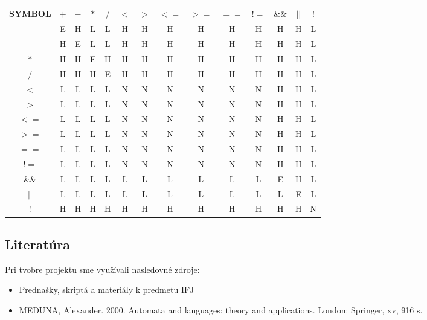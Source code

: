 \documentclass[12pt, a4paper]{article}
\begin{document}
	        \begin{center}
	            \begin{tabular}{| c | c | c | c | c | c | c | c | c | c | c | c | c | c |}
	            \hline
	            SYMBOL & $+$ & $-$ & $*$ & $/$ & $<$ & $>$ & $<=$ & $>=$ & $==$ & $!=$ & $\&\&$ & $||$ & $!$\\
	            \hline
	            $+$ & E & H & L & L & H & H & H & H & H & H & H & H & L\\
	            $-$ & H & E & L & L & H & H & H & H & H & H & H & H & L\\
	            $*$ & H & H & E & H & H & H & H & H & H & H & H & H & L\\
	            $/$ & H & H & H & E & H & H & H & H & H & H & H & H & L\\
	            $<$ & L & L & L & L & N & N & N & N & N & N & H & H & L\\
	            $>$ & L & L & L & L & N & N & N & N & N & N & H & H & L\\
	            $<=$ & L & L & L & L & N & N & N & N & N & N & H & H & L\\
	            $>=$ & L & L & L & L & N & N & N & N & N & N & H & H & L\\
	            $==$ & L & L & L & L & N & N & N & N & N & N & H & H & L\\
	            $!=$ & L & L & L & L & N & N & N & N & N & N & H & H & L\\
	            $\&\&$ & L & L & L & L & L & L & L & L & L & L & E & H & L\\
	            $||$ & L & L & L & L & L & L & L & L & L & L & L & E & L\\
	            $!$ & H & H & H & H & H & H & H & H & H & H & H & H & N\\
	            \hline
	            \end{tabular}
	        \end{center}
        \subsection{Literatúra}
	        Pri tvobre projektu sme využívali nasledovné zdroje:
	        \begin{itemize}
	            \item Prednašky, skriptá a materiály k predmetu IFJ
	            \item MEDUNA, Alexander. 2000. Automata and languages: theory and applications. London: Springer, xv, 916 s.
	        \end{itemize}
\end{document}
